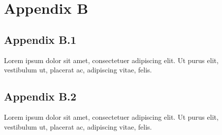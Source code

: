 
\clearpage
\section*{Appendix B}
\label{sec:appendix-b}


\subsection*{Appendix B.1}
\label{sec:appendix-b1}

Lorem ipsum dolor sit amet, consectetuer adipiscing elit. Ut purus elit, vestibulum ut, placerat ac, adipiscing vitae, felis.

\subsection*{Appendix B.2}
\label{sec:appendix-b2}

Lorem ipsum dolor sit amet, consectetuer adipiscing elit. Ut purus elit, vestibulum ut, placerat ac, adipiscing vitae, felis.

